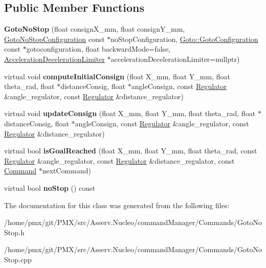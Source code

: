 \subsection*{Public Member Functions}
\begin{DoxyCompactItemize}
\item 
\mbox{\label{classGotoNoStop_a816cb4640707691b7cffa7fc1733554b}} 
{\bfseries Goto\+No\+Stop} (float consign\+X\+\_\+mm, float consign\+Y\+\_\+mm, \hyperlink{structGotoNoStop_1_1GotoNoStopConfiguration}{Goto\+No\+Stop\+Configuration} const $\ast$no\+Stop\+Configuration, \hyperlink{structGoto_1_1GotoConfiguration}{Goto\+::\+Goto\+Configuration} const $\ast$gotoconfiguration, float backward\+Mode=false, \hyperlink{classAccelerationDecelerationLimiter}{Acceleration\+Deceleration\+Limiter} $\ast$acceleration\+Deceleration\+Limiter=nullptr)
\item 
\mbox{\label{classGotoNoStop_a9cc2b4787895c0dc6dd418b1c9c66107}} 
virtual void {\bfseries compute\+Initial\+Consign} (float X\+\_\+mm, float Y\+\_\+mm, float theta\+\_\+rad, float $\ast$distance\+Consig, float $\ast$angle\+Consign, const \hyperlink{classRegulator}{Regulator} \&angle\+\_\+regulator, const \hyperlink{classRegulator}{Regulator} \&distance\+\_\+regulator)
\item 
\mbox{\label{classGotoNoStop_a9f315f737cf85218a5595ddd698d1f30}} 
virtual void {\bfseries update\+Consign} (float X\+\_\+mm, float Y\+\_\+mm, float theta\+\_\+rad, float $\ast$distance\+Consig, float $\ast$angle\+Consign, const \hyperlink{classRegulator}{Regulator} \&angle\+\_\+regulator, const \hyperlink{classRegulator}{Regulator} \&distance\+\_\+regulator)
\item 
\mbox{\label{classGotoNoStop_a8829695c25145d969a26a70996604360}} 
virtual bool {\bfseries is\+Goal\+Reached} (float X\+\_\+mm, float Y\+\_\+mm, float theta\+\_\+rad, const \hyperlink{classRegulator}{Regulator} \&angle\+\_\+regulator, const \hyperlink{classRegulator}{Regulator} \&distance\+\_\+regulator, const \hyperlink{classCommand}{Command} $\ast$next\+Command)
\item 
\mbox{\label{classGotoNoStop_a4226fbb7b827180d4a87e343ef65968a}} 
virtual bool {\bfseries no\+Stop} () const
\end{DoxyCompactItemize}


The documentation for this class was generated from the following files\+:\begin{DoxyCompactItemize}
\item 
/home/pmx/git/\+P\+M\+X/src/\+Asserv.\+Nucleo/command\+Manager/\+Commands/Goto\+No\+Stop.\+h\item 
/home/pmx/git/\+P\+M\+X/src/\+Asserv.\+Nucleo/command\+Manager/\+Commands/Goto\+No\+Stop.\+cpp\end{DoxyCompactItemize}
